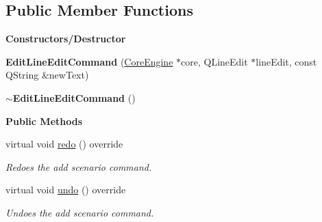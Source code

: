 \subsection*{Public Member Functions}
\begin{Indent}\textbf{ Constructors/\+Destructor}\par
\begin{DoxyCompactItemize}
\item 
\mbox{\label{classrev_1_1_edit_line_edit_command_aa261fe48aa0225faf561b0e80fefc295}} 
{\bfseries Edit\+Line\+Edit\+Command} (\mbox{\hyperlink{classrev_1_1_core_engine}{Core\+Engine}} $\ast$core, Q\+Line\+Edit $\ast$line\+Edit, const Q\+String \&new\+Text)
\item 
\mbox{\label{classrev_1_1_edit_line_edit_command_a30c3a8bffd4e71b69e162dcb2553c52f}} 
{\bfseries $\sim$\+Edit\+Line\+Edit\+Command} ()
\end{DoxyCompactItemize}
\end{Indent}
\begin{Indent}\textbf{ Public Methods}\par
\begin{DoxyCompactItemize}
\item 
\mbox{\label{classrev_1_1_edit_line_edit_command_a1c94e468b4b1f9aaec035da9db9666a6}} 
virtual void \mbox{\hyperlink{classrev_1_1_edit_line_edit_command_a1c94e468b4b1f9aaec035da9db9666a6}{redo}} () override
\begin{DoxyCompactList}\small\item\em Redoes the add scenario command. \end{DoxyCompactList}\item 
\mbox{\label{classrev_1_1_edit_line_edit_command_a510c43fc3c8f4550b0ab22ebb4a7309b}} 
virtual void \mbox{\hyperlink{classrev_1_1_edit_line_edit_command_a510c43fc3c8f4550b0ab22ebb4a7309b}{undo}} () override
\begin{DoxyCompactList}\small\item\em Undoes the add scenario command. \end{DoxyCompactList}\end{DoxyCompactItemize}
\end{Indent}
